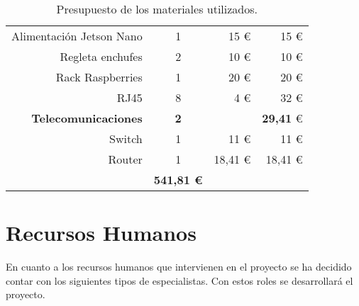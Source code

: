 \begin{table}[H]
\begin{center}
\begin{tabular}{|r|c|r|r|}
            Alimentación Jetson Nano & 1 & 15 \euro & 15 \euro\\
            Regleta enchufes & 2 & 10 \euro & 10 \euro\\
            Rack Raspberries & 1 & 20 \euro & 20 \euro\\
            RJ45 & 8 & 4 \euro & 32 \euro\\
            \hline
            \rowcolor{GrisTabla}
            \textbf{Telecomunicaciones} &  \textbf{2} & & \textbf{29,41} \euro\\
            Switch & 1 & 11 \euro & 11 \euro\\
            Router & 1 & 18,41 \euro & 18,41 \euro\\
            \hline
            \rowcolor{Naranja} 
            \multicolumn{3}{|r}{\textbf{Total}} & \textbf{541,81 \euro}\\
            \hline
        \end{tabular}
        \caption{\centering Presupuesto de los materiales utilizados.}
        \label{tab:PresupuestoMateriales}
    \end{center}    
\end{table}


\newpage
\section{Recursos Humanos}
En cuanto a los recursos humanos que intervienen en el proyecto se ha decidido contar con los siguientes tipos de especialistas. Con estos roles se desarrollará el proyecto.


